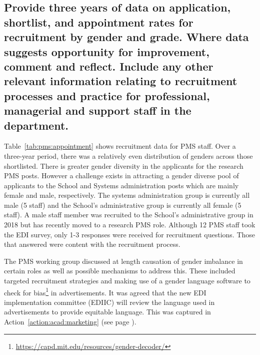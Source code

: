 
      



\subsection{Provide three years of data on application, shortlist, and appointment rates for recruitment by gender and grade. Where data suggests opportunity for improvement, comment and reflect. Include any other relevant information relating to recruitment processes and practice for professional, managerial and support staff in the department.}


Table~\ref{tab:pms:appointment} shows recruitment data for PMS staff. %
Over a three-year period, there was a relatively even distribution of genders across those shortlisted.  
There is greater gender diversity in the applicants for the research PMS posts. However a challenge exists in attracting a gender diverse pool of applicants to the School and Systems administration posts which are mainly female and male, respectively. The systems administration group is currently all male (5 staff) and the School’s administrative group is currently all female (5 staff). A male staff member was recruited to the School’s administrative group in 2018 
but has recently moved to a research PMS role. 
Although 12 PMS staff took the EDI survey, only 1-3 responses were received for recruitment questions. Those that answered were content with the recruitment process.

The PMS working group discussed at length causation of gender imbalance in certain roles as well as possible mechanisms to address this. 
These included targeted recruitment strategies and making use of a gender language software to check for bias\footnote{\url{https://capd.mit.edu/resources/gender-decoder/}} in advertisements. It was agreed that the new \ac{EDI} implementation committee (EDIIC) will review the language used in advertisements to provide equitable language. This was captured in Action~\ref{action:acad:marketing} (see page \pageref{action:acad:marketing}).


